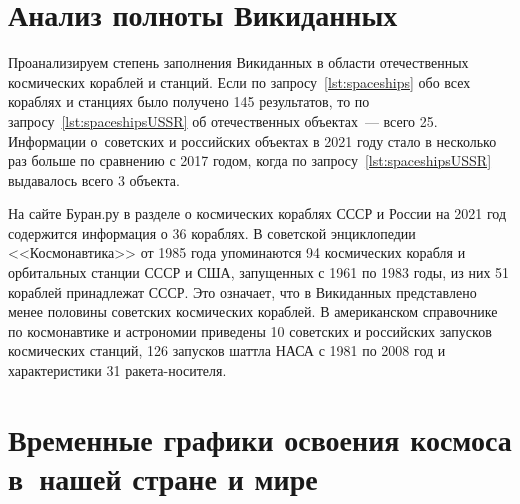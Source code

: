 \section{Анализ полноты Викиданных}

Проанализируем степень заполнения Викиданных в области отечественных космических кораблей и станций. 
Если по запросу~\ref{lst:spaceships} обо всех кораблях и станциях было получено 145 результатов, 
то по запросу~\ref{lst:spaceshipsUSSR} об отечественных объектах~--- всего 25. 
Информации о~советских и российских объектах в 2021 году 
стало в несколько раз больше по сравнению с 2017 годом, 
когда по запросу~\ref{lst:spaceshipsUSSR} выдавалось всего 3 объекта. 

На сайте Буран.ру в разделе о космических кораблях СССР и России на 2021 год 
содержится информация о 36 кораблях\autocite{spacecraftBuran}. 
В советской энциклопедии <<Космонавтика>> от 1985 года упоминаются 94 космических корабля и орбитальных станции СССР и США, запущенных с 1961 по 1983 годы, из них 51 кораблей принадлежат СССР\autocite[498]{spacecraftCosmonavtika}. Это означает, что в Викиданных представлено менее половины советских космических кораблей. 
В американском справочнике по космонавтике и астрономии 
приведены 10 советских и российских запусков космических станций\autocite[296]{spacecraftSAA}, 
126 запусков шаттла НАСА с 1981 по 2008 год\autocite[288]{spacecraftSAA} 
и характеристики 31 ракета-носителя\autocite[290--291]{spacecraftSAA}. 



\section{Временные графики освоения космоса в~нашей стране и мире}


